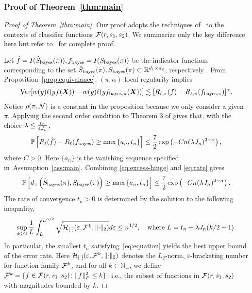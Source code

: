 \documentclass[11pt]{article}
\theoremstyle{plain}
\theoremstyle{definition}
\def\bayesf{f_{\textup{bayes}}}
\def\bayesS{S_{\textup{bayes}}}
\def\bayespif{f_{\textup{bayes},\pi}}
\begin{document}
\subsubsection{Proof of Theorem~\ref{thm:main}}
\begin{proof}[Proof of Theorem~\ref{thm:main}]
Our proof adopts the techniques of~\citet[Theorem 3]{wang2008probability} to the contexts of classifier functions $\mathcal{F}(r,s_1,s_2)$. We summarize only the key difference here but refer to~\cite{wang2008probability} for complete proof. 

Let $\hat f = I(\hat S_{\text{bayes}}(\pi)),\bayesf = I(\bayesS(\pi))$ be the indicator functions corresponding to the set $\hat S_{\text{bayes}}(\pi),\bayesS(\pi)\subset \mathbb{R}^{d_1\times d_2}$, respectively .
From Proposition~\ref{prop:equivalance},  $(\pi,\alpha)$-local regularity implies 
\begin{align}
\text{Var}[w(y)\ell(yf(\mX))-w(y)\ell(y\bayespif(\mX))]\lesssim [R_{\ell,\pi}(f)-R_{\ell,\pi}(\bayespif)]^\alpha.
\end{align}
Notice $\rho(\pi,\mathcal{N})$ is a constant in the proposition because we only consider a given $\pi$.
Applying the second order condition to Theorem 3 of \cite{wang2008probability} gives that, with the choice $\lambda\leq {t_n\over 4J_n}$, 
\begin{equation}\label{eq:rate}
\mathbb{P}\left[R_\ell(\hat f)-R_\ell(\bayesf)\geq \max\left\{a_n, t_n\right\}\right]\leq {7\over 2}\exp\left( -Cn(\lambda J_n)^{2-\alpha}\right), 
\end{equation}
where $C>0$. Here $\{a_n\}$ is the vanishing sequence specified in~Assumption~\ref{ass:main}. Combining \eqref{eq:excess-hinge} and \eqref{eq:rate} gives
\begin{equation}
\mathbb{P}\left[d_\pi\left(\hat S_{\text{bayes}}(\pi),\bayesS(\pi)\right)\geq \max\left\{a_n, t_n\right\}\right]\leq {7\over 2}\exp\left( -Cn(\lambda J_n)^{2-\alpha}\right).
\end{equation}
The rate of convergence $t_n>0$ is determined by the solution to the following inequality,
\begin{equation}\label{eq:equation}
\sup_{k\geq 2}{1\over L}\int_{L}^{L^{\alpha/2}}\sqrt{\tH_{[\ ]}(\varepsilon, \tF^{k},\vnormSize{}{\cdot})}d\varepsilon \leq n^{1/2}, \quad \text{where }L=t_n+\lambda J_n(k/2-1).
\end{equation}
In particular, the smallest $t_n$ satisfying~\eqref{eq:equation} yields the best upper bound of the error rate. Here $\tH_{[\ ]}(\varepsilon, \tF^{k}, \vnormSize{}{\cdot})$ denotes the $L_2$-norm, $\varepsilon$-bracketing number for function family $\mathcal{F}^{k}$, and for all $k\in \mathbb{N}_{+}$, we define $\mathcal{F}^{k}=\{f\in\mathcal{F}(r,s_1,s_2)\colon \lVert f\rVert_F^2\leq k\}$; i.e., the subset of functions in $\mathcal{F}(r,s_1,s_2)$ with magnitudes bounded by $k$. 


\end{proof}
\end{document}
